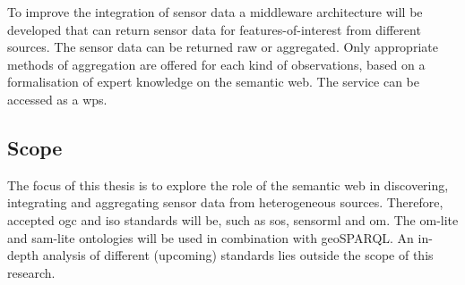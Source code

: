 To improve the integration of sensor data a middleware architecture will be developed that can return sensor data for features-of-interest from different sources. The sensor data can be returned raw or aggregated. Only appropriate methods of aggregation are offered for each kind of observations, based on a formalisation of expert knowledge on the semantic web. The service can be accessed as a \ac{wps}.

\subsection{Scope}
The focus of this thesis is to explore the role of the semantic web in discovering, integrating and aggregating sensor data from heterogeneous sources. Therefore, accepted \ac{ogc} and \ac{iso} standards will be, such as \ac{sos}, \ac{sensorml} and \ac{om}. The om-lite and sam-lite ontologies will be used in combination with geoSPARQL. An in-depth analysis of different (upcoming) standards lies outside the scope of this research. 